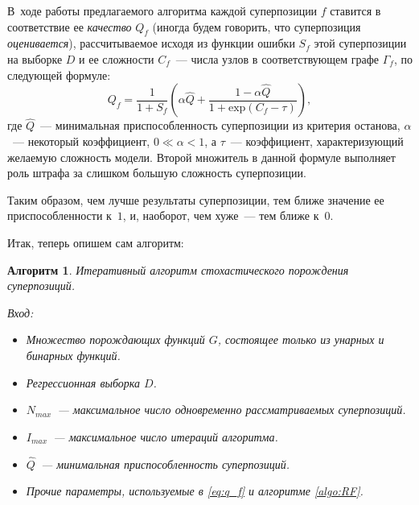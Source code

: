 \documentclass[12pt,a4paper]{amsart}
\newtheorem{algo}{Алгоритм}
\begin{document}
В~ходе работы предлагаемого алгоритма каждой суперпозиции $f$ ставится в
соответствие ее \emph{качество} $Q_f$ (иногда будем говорить, что
суперпозиция \emph{оценивается}), рассчитываемое исходя из функции ошибки
$S_f$ этой суперпозиции на выборке $D$ и ее сложности $C_f$~---
числа узлов в соответствующем графе $\Gamma_f$, по следующей формуле:
\begin{equation}
  \label{eq:q_f}
  Q_f = \frac{1}{1 + S_f} \left(\alpha \hat{Q} + \frac{1 - \alpha \hat{Q}}{1 + \text{exp} (C_f - \tau)}\right),
\end{equation}
где $\hat{Q}$~--- минимальная приспособленность суперпозиции из критерия
останова, $\alpha$~--- некоторый коэффициент, $0 \ll \alpha < 1$, а
$\tau$~--- коэффициент, характеризующий желаемую сложность модели.
Второй множитель в данной формуле выполняет роль штрафа за слишком
большую сложность суперпозиции.

Таким образом, чем лучше результаты суперпозиции, тем ближе значение ее
приспособленности к~$1$, и, наоборот, чем хуже~--- тем ближе к~$0$.

Итак, теперь опишем сам алгоритм:
\begin{algo}
  \label{algo:SA}
  Итеративный алгоритм стохастического порождения суперпозиций.

  Вход:
  \begin{itemize}
	\item Множество порождающих функций $G$, состоящее только из унарных
	  и бинарных функций.
	\item Регрессионная выборка $D$.
	\item $N_{max}$~--- максимальное число одновременно рассматриваемых
	  суперпозиций.
	\item $I_{max}$~--- максимальное число итераций алгоритма.
	\item $\hat{Q}$~--- минимальная приспособленность суперпозиций.
	\item Прочие параметры, используемые в \eqref{eq:q_f} и алгоритме
	  \ref{algo:RF}.
  \end{itemize}
\end{algo}
\end{document}

